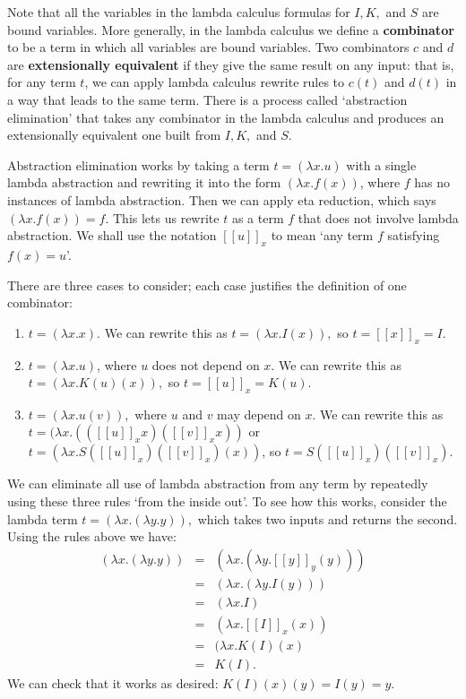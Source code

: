 \documentclass[12pt,twoside,openright]{report}
\begin{document}
Note that all the variables in the lambda calculus formulas for $I, K,$ and $S$ are bound variables.  More generally, in the lambda calculus we define a {\bf combinator} to be a term in which all variables are bound variables.  Two combinators $c$ and $d$ are {\bf extensionally equivalent} if they give the same result on any input:
that is, for any term $t$, we can apply lambda calculus rewrite rules to $c(t)$ and $d(t)$ in a way that leads to the same term.  There is a process called `abstraction elimination' that takes any combinator in the lambda calculus and produces an extensionally equivalent one built from $I, K,$ and $S$.

Abstraction elimination works by taking a term $t = (\lambda x.u)$
with a single lambda abstraction and rewriting it into the form
$(\lambda x.f(x))$, where $f$ has no instances of lambda abstraction. Then we can apply eta reduction, which says $(\lambda x. f(x)) = f$. This lets us rewrite $t$ as a term $f$ that does not involve lambda abstraction.  We shall use the notation $[[u]]_x$ to mean `any term
$f$ satisfying $f(x) = u$'.

There are three cases to consider; each case justifies the definition of one combinator:
\begin{enumerate}
  \item $t = (\lambda x.x)$. 
    We can rewrite this as $t = (\lambda x.I(x)),$ so $t = [[x]]_x = I$.  
  \item $t = (\lambda x. u)$, where $u$ does not depend on $x$.
    We can rewrite this as $t = (\lambda x. K(u)(x)),$ so 
   $t = [[u]]_x = K(u).$
  \item $t = (\lambda x. u(v)),$ where $u$ and $v$ may depend
    on $x$.  We can rewrite this as 
    $t = (\lambda x.(([[u]]_x x) ([[v]]_x x))$ or
    $t = (\lambda x. S([[u]]_x)([[v]]_x)(x))$, so $t = S([[u]]_x)([[v]]_x).$
\end{enumerate}

We can eliminate all use of lambda abstraction from any term by repeatedly using these three rules `from the inside out'.  To see how this works, consider the lambda term $t = (\lambda x. (\lambda y. y)),$ which takes two inputs and returns the second. Using the rules above we have:
\[
\begin{array}{ccl}
  (\lambda x. (\lambda y.y)) 
    &=& (\lambda x. (\lambda y. [[y]]_y(y))) \\
    &=& (\lambda x. (\lambda y. I(y))) \\
    &=& (\lambda x.I) \\
    &=& (\lambda x. [[I]]_x(x)) \\
    &=& (\lambda x. K(I)(x) \\
    &=& K(I) .
\end{array}
\]
We can check that it works as desired: $K(I)(x)(y) = I(y) = y.$  
\end{document}
